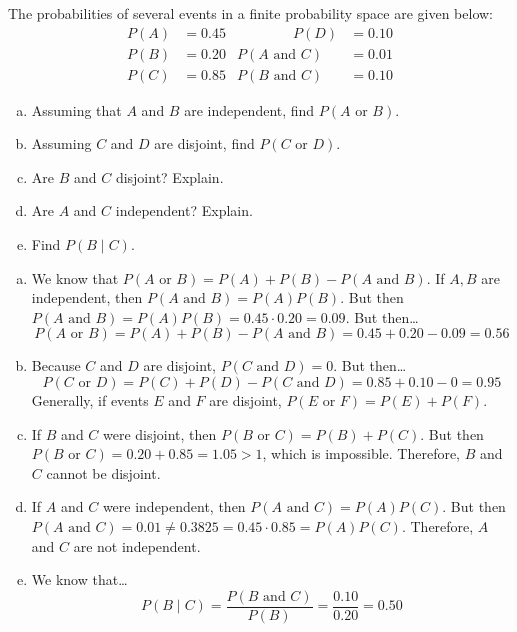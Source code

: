 \documentclass[11pt,letterpaper]{article}
\begin{document}

 The probabilities of several events in a finite probability space are given below:
	\[
	\begin{aligned}
	P(A)&= 0.45 &\qquad\qquad P(D)&= 0.10 \\
	P(B)&= 0.20 & P(A \text{ and } C)&= 0.01 \\
	P(C)&= 0.85 & P(B \text{ and } C)&= 0.10 
	\end{aligned}
	\] 
\begin{enumerate}[(a)]
\item Assuming that $A$ and $B$ are independent, find $P(A \text{ or } B)$.
\item Assuming $C$ and $D$ are disjoint, find $P(C \text{ or } D)$.
\item Are $B$ and $C$ disjoint? Explain.
\item Are $A$ and $C$ independent? Explain. 
\item Find $P(B \;|\; C)$.
\end{enumerate} \pspace

\sol 
\begin{enumerate}[(a)]
\item We know that $P(A \text{ or } B)= P(A) + P(B) - P(A \text{ and } B)$. If $A, B$ are independent, then $P(A \text{ and } B)= P(A) P(B)$. But then $P(A \text{ and } B)= P(A) P(B)= 0.45 \cdot 0.20= 0.09$. But then\dots
	\[
	P(A \text{ or } B)= P(A) + P(B) - P(A \text{ and } B)= 0.45 + 0.20 - 0.09= 0.56
	\] \pspace

\item Because $C$ and $D$ are disjoint, $P(C \text{ and } D)= 0$. But then\dots
	\[
	P(C \text{ or } D)= P(C) + P(D) - P(C \text{ and } D)= 0.85 + 0.10 - 0= 0.95
	\]
Generally, if events $E$ and $F$ are disjoint, $P(E \text{ or } F)= P(E) + P(F)$. \pspace

\item If $B$ and $C$ were disjoint, then $P(B \text{ or } C)= P(B) + P(C)$. But then $P(B \text{ or } C)= 0.20 + 0.85= 1.05 > 1$, which is impossible. Therefore, $B$ and $C$ cannot be disjoint. \pspace

\item If $A$ and $C$ were independent, then $P(A \text{ and } C)= P(A) P(C)$. But then $P(A \text{ and } C)= 0.01 \neq 0.3825= 0.45 \cdot 0.85= P(A) P(C)$. Therefore, $A$ and $C$ are not independent. \pspace

\item We know that\dots
	\[
	P(B \;|\; C)= \dfrac{P(B \text{ and } C)}{P(B)}= \dfrac{0.10}{0.20}= 0.50
	\]
\end{enumerate}
\end{document}
